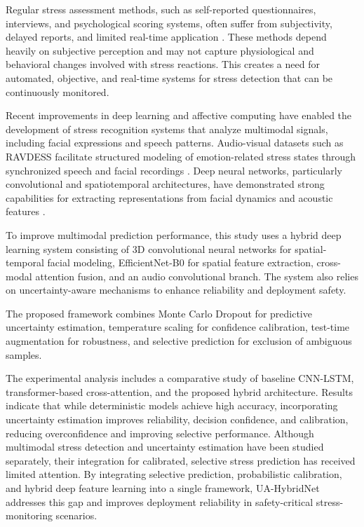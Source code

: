 \documentclass[conference]{IEEEtran}
\begin{document}
Regular stress assessment methods, such as self-reported questionnaires, interviews, and psychological scoring systems, often suffer from subjectivity, delayed reports, and limited real-time application \cite{ref4}. These methods depend heavily on subjective perception and may not capture physiological and behavioral changes involved with stress reactions. This creates a need for automated, objective, and real-time systems for stress detection that can be continuously monitored. 

Recent improvements in deep learning and affective computing have enabled the development of stress recognition systems that analyze multimodal signals, including facial expressions and speech patterns. Audio-visual datasets such as RAVDESS facilitate structured modeling of emotion-related stress states through synchronized speech and facial recordings \cite{ref5}. Deep neural networks, particularly convolutional and spatiotemporal architectures, have demonstrated strong capabilities for extracting representations from facial dynamics and acoustic features \cite{ref6,ref7,ref8}. 

To improve multimodal prediction performance, this study uses a hybrid deep learning system consisting of 3D convolutional neural networks for spatial-temporal facial modeling, EfficientNet-B0 for spatial feature extraction, cross-modal attention fusion, and an audio convolutional branch. The system also relies on uncertainty-aware mechanisms to enhance reliability and deployment safety.

The proposed framework combines Monte Carlo Dropout for predictive uncertainty estimation, temperature scaling for confidence calibration, test-time augmentation for robustness, and selective prediction for exclusion of ambiguous samples.

The experimental analysis includes a comparative study of baseline CNN-LSTM, transformer-based cross-attention, and the proposed hybrid architecture. Results indicate that while deterministic models achieve high accuracy, incorporating uncertainty estimation improves reliability, decision confidence, and calibration, reducing overconfidence and improving selective performance. Although multimodal stress detection and uncertainty estimation have been studied separately, their integration for calibrated, selective stress prediction has received limited attention. By integrating selective prediction, probabilistic calibration, and hybrid deep feature learning into a single framework, UA-HybridNet addresses this gap and improves deployment reliability in safety-critical stress-monitoring scenarios.
\end{document}
